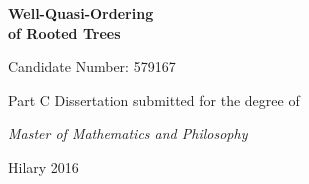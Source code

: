 \thispagestyle{empty}
\vfill
\begin{center}
{\Huge \bfseries
	Well-Quasi-Ordering \\[1ex] of Rooted Trees
} \par
      
\large 
\vspace*{30mm} 
\logo \par
\vspace*{30mm}
Candidate Number: 579167 \par
\vspace*{8ex}   
Part C Dissertation submitted for the degree of \par
\vspace*{1ex}
\textit{Master of Mathematics and Philosophy} \par
\vspace*{16ex}
Hilary 2016
  \end{center}
\vfill
